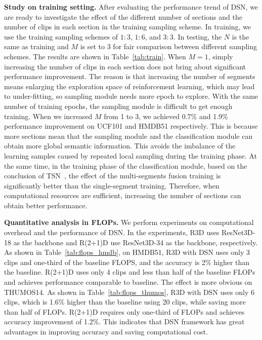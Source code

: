 \documentclass[journal]{IEEEtran}
\begin{document}
\textbf{Study on training setting.}
After evaluating the performance trend of DSN, we are ready to investigate the effect of the different number of sections and the number of clips in each section in the training sampling scheme.
In training, we use the training sampling schemes of $1:3$, $1:6$, and $3:3$. In testing, the $N$ is the same as training and $M$ is set to 3 for fair comparison between different sampling schemes.
The results are shown in Table~\ref{tab:train}.
When $M=1$, simply increasing the number of clips in each section does not bring about significant performance improvement.
The reason is that increasing the number of segments means enlarging the exploration space of reinforcement learning, which may lead to under-fitting, so sampling module needs more epoch to explore.
With the same number of training epochs, the sampling module is difficult to get enough training.
When we increased $M$ from 1 to 3, we achieved 0.7\% and 1.9\% performance improvement on UCF101 and HMDB51 respectively.
This is because more sections mean that the sampling module and the classification module can obtain more global semantic information.
This avoids the imbalance of the learning samples caused by repeated local sampling during the training phase.
At the same time, in the training phase of the classification module, based on the conclusion of TSN~\cite{TSN-J}, the effect of the multi-segments fusion training is significantly better than the single-segment training.
Therefore, when computational resources are sufficient, increasing the number of sections can obtain better performance.


\textbf{Quantitative analysis in FLOPs.}
We perform experiments on computational overhead and the performance of DSN.
In the experiments, R3D uses ResNet3D-18 as the backbone and R(2+1)D use ResNet3D-34 as the backbone, respectively.
As shown in Table~\ref{tab:flops_hmdb}, on HMDB51, R3D with DSN uses only 3 clips and one-third of the baseline FLOPS, and the accuracy is 2\% higher than the baseline.
R(2+1)D uses only 4 clips and less than half of the baseline FLOPs and achieves performance comparable to baseline.
The effect is more obvious on THUMOS14.
As shown in Table~\ref{tab:flops_thumos}, R3D with DSN uses only 6 clips, which is 1.6\% higher than the baseline using 20 clips, while saving more than half of FLOPs.
R(2+1)D requires only one-third of FLOPs and achieves accuracy improvement of 1.2\%.
This indicates that DSN framework has great advantages in improving accuracy and saving computational cost.
\end{document}
